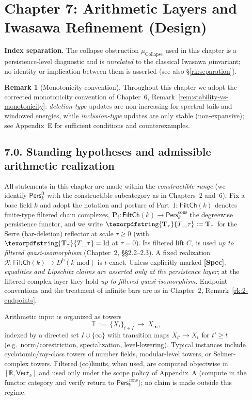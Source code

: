 \documentclass[11pt]{article}
\numberwithin{equation}{section}
\theoremstyle{plain}
\theoremstyle{definition}
\theoremstyle{remark}
\DeclareRobustCommand{\hyp}{\nobreakdash-}
\newcommand{\Pers}{\mathsf{Pers}}
\newcommand{\Rfun}{\mathcal{R}}
\theoremstyle{plain}
\theoremstyle{definition}
\numberwithin{equation}{section}
\theoremstyle{definition}
\newtheorem{remark}[theorem]{Remark}
\DeclareRobustCommand{\FiltCh}[1]{\mathsf{FiltCh}(#1)}
\DeclareRobustCommand{\Ttau}{\texorpdfstring{\ensuremath{\mathbf{T}_{\tau}}}{T\_\tau}}
\DeclareRobustCommand{\muc}{\mu_{\mathrm{Collapse}}}
\numberwithin{equation}{section}
\theoremstyle{plain}
\theoremstyle{definition}
\theoremstyle{remark}
\providecommand{\Tfun}[1]{\mathbf{T}_{#1}}
\providecommand{\Ttau}{\Tfun{\tau}}
\providecommand{\muc}{\mu_{\mathrm{Collapse}}}
\begin{document}
\section{Chapter 7: Arithmetic Layers and Iwasawa Refinement (Design)}

\noindent\textbf{Index separation.} The collapse obstruction \(\muc\) used in this chapter is a persistence\hyp level diagnostic and is \emph{unrelated} to the classical Iwasawa \(\mu\)\nobreakdash invariant; no identity or implication between them is asserted (see also §\ref{rk:separation}).

\begin{remark}[Monotonicity convention]
Throughout this chapter we adopt the corrected monotonicity convention of
Chapter~6, Remark~\ref{rem:stability-vs-monotonicity}:
\emph{deletion\hyp type} updates are non\hyp increasing for spectral tails and windowed energies,
while \emph{inclusion\hyp type} updates are only stable (non\hyp expansive);
see Appendix~E for sufficient conditions and counterexamples.
\end{remark}

\subsection*{7.0. Standing hypotheses and admissible arithmetic realization}
All statements in this chapter are made within the \emph{constructible range}
(we identify \(\Pers^{\mathrm{ft}}_k\) with the constructible subcategory as in Chapters~2 and~6).
Fix a base field \(k\) and adopt the notation and posture of Part~I:
\(\FiltCh{k}\) denotes finite\hyp type filtered chain complexes,
\(\mathbf{P}_i:\FiltCh{k}\to\Pers^{\mathrm{cons}}_k\) the degreewise persistence functor,
and we write \(\Ttau:=\mathbf{T}_\tau\) for the Serre (bar\hyp deletion) reflector at scale \(\tau\ge 0\) (with \(\Ttau=\mathrm{Id}\) at \(\tau=0\)).
Its filtered lift \(C_\tau\) is used \emph{up to filtered quasi\hyp isomorphism} (Chapter~2, §§2.2–2.3).
A fixed realization \(\Rfun:\FiltCh{k}\to D^{\mathrm{b}}(k\text{-mod})\) is \(t\)\hyp exact.
Unless explicitly marked \textbf{[Spec]}, \emph{equalities and Lipschitz claims are asserted only at the persistence layer};
at the filtered\hyp complex layer they hold \emph{up to filtered quasi\hyp isomorphism}.
Endpoint conventions and the treatment of infinite bars are as in Chapter~2, Remark~\ref{rk:2-endpoints}.

Arithmetic input is organized as towers
\[
  \mathbb{T}\ :=\ \{X_t\}_{t\in I}\ \longrightarrow\ X_\infty,
\]
indexed by a directed set \(I\cup\{\infty\}\) with transition maps \(X_{t'}\to X_t\) for \(t'\ge t\) (e.g.\ norm/corestriction, specialization, level\hyp lowering).
Typical instances include cyclotomic/ray\hyp class towers of number fields, modular\hyp level towers, or Selmer\hyp complex towers.
Filtered (co)limits, when used, are computed objectwise in \([\mathbb{R},\mathsf{Vect}_k]\) and used only under the scope policy of Appendix~A (compute in the functor category and verify return to \(\Pers^{\mathrm{cons}}_k\)); no claim is made outside this regime.
\end{document}
